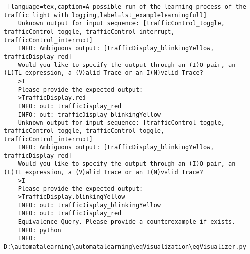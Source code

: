 \begin{lstlisting} [language=tex,caption=A possible run of the learning process of the traffic light with logging,label=lst_examplelearningfull]
	Unknown output for input sequence: [trafficControl_toggle, trafficControl_toggle, trafficControl_interrupt, trafficControl_interrupt]
	INFO: Ambiguous output: [trafficDisplay_blinkingYellow, trafficDisplay_red]
	Would you like to specify the output through an (I)O pair, an (L)TL expression, a (V)alid Trace or an I(N)valid Trace?
	>I
	Please provide the expected output:
	>TrafficDisplay.red
	INFO: out: trafficDisplay_red
	INFO: out: trafficDisplay_blinkingYellow
	Unknown output for input sequence: [trafficControl_toggle, trafficControl_toggle, trafficControl_toggle, trafficControl_interrupt]
	INFO: Ambiguous output: [trafficDisplay_blinkingYellow, trafficDisplay_red]
	Would you like to specify the output through an (I)O pair, an (L)TL expression, a (V)alid Trace or an I(N)valid Trace?
	>I
	Please provide the expected output:
	>TrafficDisplay.blinkingYellow
	INFO: out: trafficDisplay_blinkingYellow
	INFO: out: trafficDisplay_red
	Equivalence Query. Please provide a counterexample if exists.
	INFO: python
	INFO: D:\automatalearning\automatalearning\eqVisualization\eqVisualizer.py
\end{lstlisting}

